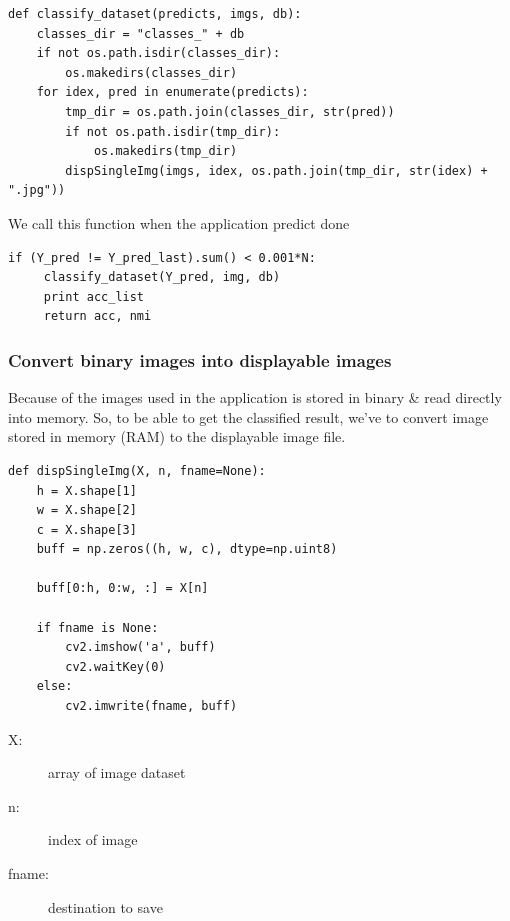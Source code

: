 \documentclass[hidelinks,12pt,a4paper]{report}
\begin{document}
\begin{lstlisting}
def classify_dataset(predicts, imgs, db):
    classes_dir = "classes_" + db
    if not os.path.isdir(classes_dir):
        os.makedirs(classes_dir)
    for idex, pred in enumerate(predicts):
        tmp_dir = os.path.join(classes_dir, str(pred))
        if not os.path.isdir(tmp_dir):
            os.makedirs(tmp_dir)
        dispSingleImg(imgs, idex, os.path.join(tmp_dir, str(idex) + ".jpg"))
\end{lstlisting}
We call this function when the application predict done
\begin{lstlisting}
if (Y_pred != Y_pred_last).sum() < 0.001*N:
     classify_dataset(Y_pred, img, db)
     print acc_list
     return acc, nmi
\end{lstlisting}

\subsubsection{Convert binary images into displayable images}
Because of the images used in the application is stored in binary \& read directly into memory. So, to be able to get the classified result, we've to convert image stored in memory (RAM) to the displayable image file. 

\begin{lstlisting}
def dispSingleImg(X, n, fname=None):
    h = X.shape[1]
    w = X.shape[2]
    c = X.shape[3]
    buff = np.zeros((h, w, c), dtype=np.uint8)

    buff[0:h, 0:w, :] = X[n]

    if fname is None:
        cv2.imshow('a', buff)
        cv2.waitKey(0)
    else:
        cv2.imwrite(fname, buff)
\end{lstlisting}
\begin{description}
\item[X:] array of image dataset
\item[n:] index of image
\item[fname:] destination to save
\end{description}
\end{document}
